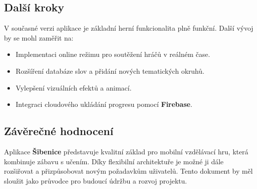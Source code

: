 \documentclass[a4paper,12pt]{article}
\begin{document}
\subsection{Další kroky}

V současné verzi aplikace je základní herní funkcionalita plně funkční. Další vývoj by se mohl zaměřit na:
\begin{itemize}
    \item Implementaci online režimu pro soutěžení hráčů v reálném čase.
    \item Rozšíření databáze slov a přidání nových tematických okruhů.
    \item Vylepšení vizuálních efektů a animací.
    \item Integraci cloudového ukládání progresu pomocí \textbf{Firebase}.
\end{itemize}

\subsection{Závěrečné hodnocení}

Aplikace \textbf{Šibenice} představuje kvalitní základ pro mobilní vzdělávací hru, která kombinuje zábavu s učením. Díky flexibilní architektuře je možné ji dále rozšiřovat a přizpůsobovat novým požadavkům uživatelů. Tento dokument by měl sloužit jako průvodce pro budoucí údržbu a rozvoj projektu.
\end{document}
